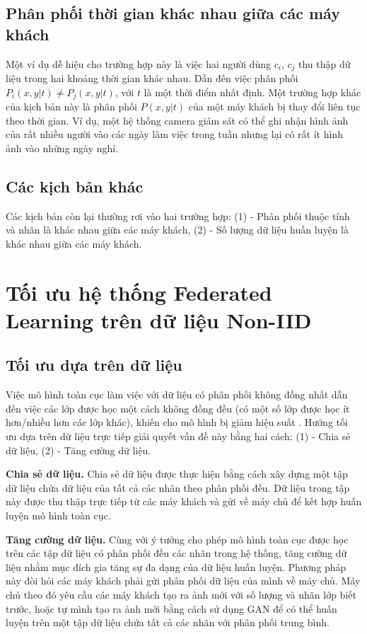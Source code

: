 \subsection{Phân phối thời gian khác nhau giữa các máy khách}

Một ví dụ dễ hiệu cho trường hợp này là việc hai người dùng $c_i$, $c_j$ thu thập dữ liệu trong hai khoảng thời gian khác nhau. Dẫn đến việc phân phối $P_i(x, y|t) \ne P_j(x, y|t)$, với $t$ là một thời điểm nhất định. Một trường hợp khác của kịch bản này là phân phối $P(x, y|t)$ của một máy khách bị thay đổi liên tục theo thời gian. Ví dụ, một hệ thống camera giám sát có thể ghi nhận hình ảnh của rất nhiều người vào các ngày làm việc trong tuần nhưng lại có rất ít hình ảnh vào những ngày nghỉ.

\subsection{Các kịch bản khác}

Các kịch bản còn lại thường rơi vào hai trường hợp: (1) - Phân phối thuộc tính và nhãn là khác nhau giữa các máy khách, (2) - Số lượng dữ liệu huấn luyện là khác nhau giữa các máy khách.

\section{Tối ưu hệ thống Federated Learning trên dữ liệu Non-IID}

\subsection{Tối ưu dựa trên dữ liệu}

Việc mô hình toàn cục làm việc với dữ liệu có phân phối không đồng nhất dẫn đến việc các lớp được học một cách không đồng đều (có một số lớp được học ít hơn/nhiều hơn các lớp khác), khiến cho mô hình bị giảm hiệu suất \cite{zhu2021federated}. Hướng tối ưu dựa trên dữ liệu trực tiếp giải quyết vấn đề này bằng hai cách: (1) - Chia sẻ dữ liệu, (2) - Tăng cường dữ liệu.

\textbf{Chia sẻ dữ liệu.} Chia sẻ dữ liệu \cite{zhao2018federated} được thực hiện bằng cách xây dựng một tập dữ liệu chứa dữ liệu của tất cả các nhãn theo phân phối đều. Dữ liệu trong tập này được thu thập trực tiếp từ các máy khách và gửi về máy chủ để kết hợp huấn luyện mô hình toàn cục.

\textbf{Tăng cường dữ liệu.} Cùng với ý tưởng cho phép mô hình toàn cục được học trên các tập dữ liệu có phân phối đều các nhãn trong hệ thống, tăng cường dữ liệu \cite{tanner1987calculation} nhằm mục đích gia tăng sự đa dạng của dữ liệu huấn luyện. Phương pháp này đòi hỏi các máy khách phải gửi phân phối dữ liệu của mình về máy chủ. Máy chủ theo đó yêu cầu các máy khách tạo ra ảnh mới \cite{duan2019astraea} với số lượng và nhãn lớp biết trước, hoặc tự mình tạo ra ảnh mới bằng cách sử dụng GAN \cite{zhu2021federated} để có thể huấn luyện trên một tập dữ liệu chứa tất cả các nhãn với phân phối trung bình.

